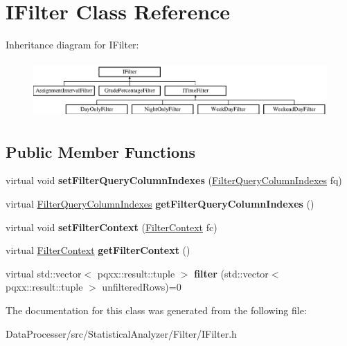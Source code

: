 \hypertarget{classIFilter}{}\section{I\+Filter Class Reference}
\label{classIFilter}
Inheritance diagram for I\+Filter\+:\begin{figure}[H]
\begin{center}
\leavevmode
\includegraphics[height=2.167742cm]{classIFilter}
\end{center}
\end{figure}
\subsection*{Public Member Functions}
\begin{DoxyCompactItemize}
\item 
\mbox{\label{classIFilter_ad66e2b3f6268436f2b7b127dab38633d}} 
virtual void {\bfseries set\+Filter\+Query\+Column\+Indexes} (\hyperlink{structFilterQueryColumnIndexes}{Filter\+Query\+Column\+Indexes} fq)
\item 
\mbox{\label{classIFilter_aab274a76ddbba2591c9112edf4bfbc26}} 
virtual \hyperlink{structFilterQueryColumnIndexes}{Filter\+Query\+Column\+Indexes} {\bfseries get\+Filter\+Query\+Column\+Indexes} ()
\item 
\mbox{\label{classIFilter_a1ab08052b3949763ea2f0dd04a05030b}} 
virtual void {\bfseries set\+Filter\+Context} (\hyperlink{structFilterContext}{Filter\+Context} fc)
\item 
\mbox{\label{classIFilter_a5e3249740f7f913a03d09f4437d98be4}} 
virtual \hyperlink{structFilterContext}{Filter\+Context} {\bfseries get\+Filter\+Context} ()
\item 
\mbox{\label{classIFilter_a3abe23670a8b3641fae336cf5efdb775}} 
virtual std\+::vector$<$ pqxx\+::result\+::tuple $>$ {\bfseries filter} (std\+::vector$<$ pqxx\+::result\+::tuple $>$ unfiltered\+Rows)=0
\end{DoxyCompactItemize}


The documentation for this class was generated from the following file\+:\begin{DoxyCompactItemize}
\item 
Data\+Processer/src/\+Statistical\+Analyzer/\+Filter/I\+Filter.\+h\end{DoxyCompactItemize}
